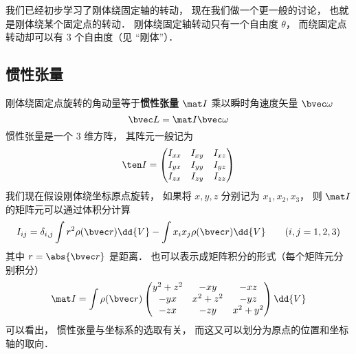 

我们已经初步学习了刚体绕固定轴的转动， 现在我们做一个更一般的讨论， 也就是刚体绕某个固定点的转动． 刚体绕固定轴转动只有一个自由度 $\theta$， 而绕固定点转动却可以有 3 个自由度（见 “刚体”）．

\subsection{惯性张量}
刚体绕固定点旋转的角动量等于\textbf{惯性张量} $\mat I$ 乘以瞬时角速度矢量 $\bvec \omega$
\begin{equation}\label{ITensr_eq3}
\bvec L = \mat I \bvec \omega
\end{equation}
惯性张量是一个 3 维方阵， 其阵元一般记为
\begin{equation}
\ten I = \begin{pmatrix}
I_{xx}& I_{xy}& I_{xz} \\
I_{yx}& I_{yy}& I_{yz} \\
I_{zx}& I_{zy}& I_{zz}
\end{pmatrix}
\end{equation}
我们现在假设刚体绕坐标原点旋转， 如果将 $x, y, z$ 分别记为 $x_1, x_2, x_3$， 则 $\mat I$ 的矩阵元可以通过体积分计算
\begin{equation}\label{ITensr_eq1}
I_{ij} = \delta_{i, j} \int r^2 \rho(\bvec r)\dd{V} - \int x_i x_j \rho(\bvec r)\dd{V} \qquad (i, j = 1, 2, 3)
\end{equation}
其中 $r = \abs{\bvec r}$ 是距离． 也可以表示成矩阵积分的形式（每个矩阵元分别积分）
\begin{equation}\label{ITensr_eq2}
\mat I = \int \rho(\bvec r)
\begin{pmatrix}
y^2 + z^2 & -xy & -xz\\
-yx & x^2 + z^2 & -yz\\
-zx & -zy & x^2 + y^2
\end{pmatrix}
\dd{V}
\end{equation}
可以看出， 惯性张量与坐标系的选取有关， 而这又可以划分为原点的位置和坐标轴的取向．

